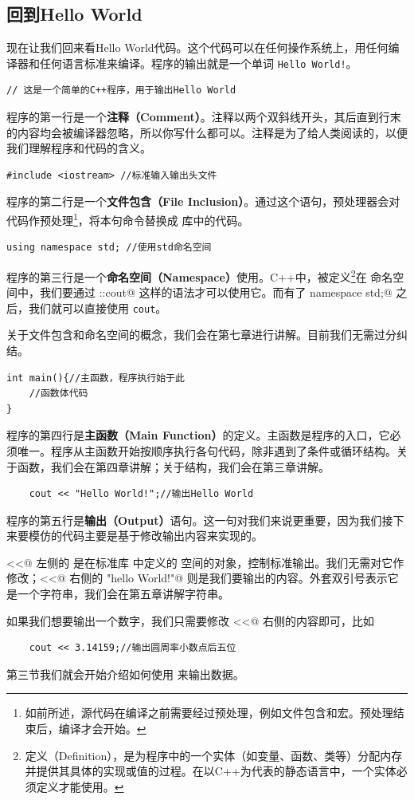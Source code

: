 \subsection*{回到Hello World}
现在让我们回来看Hello World代码。这个代码可以在任何操作系统上，用任何编译器和任何语言标准来编译。程序的输出就是一个单词 \texttt{Hello World!}。\par
\begin{lstlisting}
// 这是一个简单的C++程序，用于输出Hello World
\end{lstlisting}
程序的第一行是一个\textbf{注释（Comment）}。注释以两个双斜线开头，其后直到行末的内容均会被编译器忽略，所以你写什么都可以。注释是为了给人类阅读的，以便我们理解程序和代码的含义。\par
\begin{lstlisting}
#include <iostream> //标准输入输出头文件
\end{lstlisting}
程序的第二行是一个\textbf{文件包含（File Inclusion）}。通过这个语句，预处理器会对代码作预处理\footnote{如前所述，源代码在编译之前需要经过预处理，例如文件包含和宏。预处理结束后，编译才会开始。}，将本句命令替换成 \lstinline@iostream@ 库中的代码。\par
\begin{lstlisting}
using namespace std; //使用std命名空间
\end{lstlisting}
程序的第三行是一个\textbf{命名空间（Namespace）}使用。C++中，\lstinline@cout@ 被定义\footnote{定义（Definition），是为程序中的一个实体（如变量、函数、类等）分配内存并提供其具体的实现或值的过程。在以C++为代表的静态语言中，一个实体必须定义才能使用。}在 \lstinline@std@ 命名空间中，我们要通过 \lstinline@std::cout@ 这样的语法才可以使用它。而有了 \lstinline@using namespace std;@ 之后，我们就可以直接使用 \lstinline{cout}。\par
关于文件包含和命名空间的概念，我们会在第七章进行讲解。目前我们无需过分纠结。\par
\begin{lstlisting}
int main(){//主函数，程序执行始于此
    //函数体代码
}
\end{lstlisting}
程序的第四行是\textbf{主函数（Main Function）}的定义。主函数是程序的入口，它必须唯一。程序从主函数开始按顺序执行各句代码，除非遇到了条件或循环结构。关于函数，我们会在第四章讲解；关于结构，我们会在第三章讲解。\par
\begin{lstlisting}
    cout << "Hello World!";//输出Hello World
\end{lstlisting}
程序的第五行是\textbf{输出（Output）}语句。这一句对我们来说更重要，因为我们接下来要模仿的代码主要是基于修改输出内容来实现的。\par
\lstinline@<<@ 左侧的 \lstinline@cout@ 是在标准库 \lstinline@iostream@ 中定义的 \lstinline@std@ 空间的对象，控制标准输出。我们无需对它作修改；\lstinline@<<@ 右侧的 \lstinline@"hello World!"@ 则是我们要输出的内容。外套双引号表示它是一个字符串，我们会在第五章讲解字符串。\par
如果我们想要输出一个数字，我们只需要修改 \lstinline@<<@ 右侧的内容即可，比如
\begin{lstlisting}
    cout << 3.14159;//输出圆周率小数点后五位
\end{lstlisting}
第三节我们就会开始介绍如何使用 \lstinline@cout@ 来输出数据。\par
